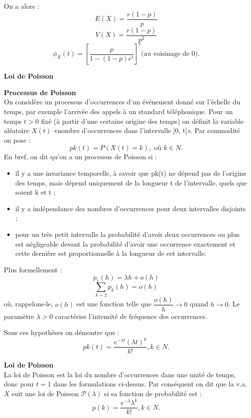 \documentclass[../PolyS4.tex]{subfiles}
\begin{document}
\begin{Prop}
On a alors :
$$E(X) =\dfrac{r(1 - p)}{p}$$
$$V (X) =\dfrac{r(1 - p)}{p^2}$$
$$\phi_X(t) = \left[
\dfrac{p}{1- (1 -p)e^t} \right]^r \text{(au voisinage de $0$)} .$$
\end{Prop}

\newpage
\textbf{Loi de Poisson}



\begin{Def}\textbf{Processus de Poisson}\\
On considère un processus d'occurrences d'un événement donné sur l'échelle du temps, par exemple l'arrivée des appels à un standard téléphonique. Pour un temps $ t > 0$ fixé (à partir d'une certaine origine des temps) on définit la variable aléatoire $X(t)$ «nombre d'occurrences dans l'intervalle ]0, t]». Par commodité on pose :
$$pk(t) = P(X(t) = k), \text{ où }k \in N.$$
En bref, on dit qu'on a un processus de Poisson si :
\begin{itemize} 
\item il y a une invariance temporelle, à savoir que pk(t) ne dépend pas de l'origine
des temps, mais dépend uniquement de la longueur t de l'intervalle,
quels que soient k et t ;
\item il y a indépendance des nombres d'occurrences pour deux intervalles disjoints
;
\item pour un très petit intervalle la probabilité d'avoir deux occurrences ou
plus est négligeable devant la probabilité d'avoir une occurrence exactement
et cette dernière est proportionnelle à la longueur de cet intervalle.
\end{itemize}
Plus formellement :
$$p_1(h) = \lambda h + o(h)$$
$$\sum_{k=2} p_k(h) = o(h)$$
où, rappelons-le, $o(h)$ est une fonction telle que
$\dfrac{o(h)} {h}\to 0$ quand $h \to 0$.
Le paramètre $\lambda > 0$ caractérise l'intensité de fréquence des occurrences.\\
\end{Def}

Sous ces hypothèses on démontre que :
$$pk(t) =
\dfrac{e^{-\lambda t}(\lambda t)^k}{k!}
, k \in N.$$
\begin{Def}\textbf{Loi de Poisson}\\
La loi de Poisson est la loi du nombre d'occurrences dans une unité de temps, donc pour $ t = 1$ dans les formulations ci-dessus. Par conséquent on dit que la v.a. $X$ suit une loi de Poisson $\mathcal P(\lambda)$ si sa fonction de probabilité est :
$$p(k) = \dfrac{e^{-\lambda}\lambda^k} {k!} , k \in N.$$
\end{Def}
\end{document}
